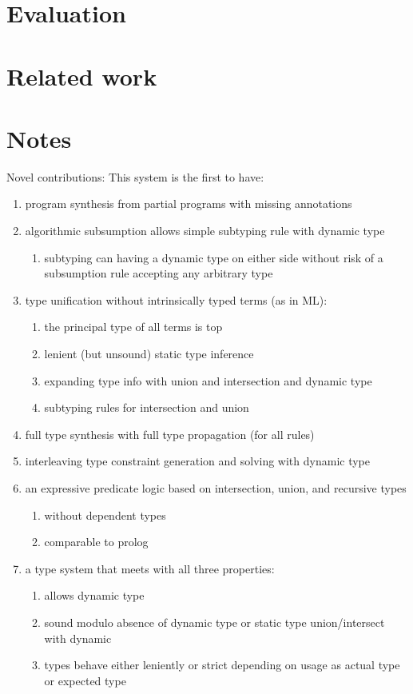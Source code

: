 \documentclass[sigplan,screen]{acmart}
\begin{document}
\section{Evaluation}

\section{Related work}

\section*{Notes}

Novel contributions: This system is the first to have:
\begin{enumerate}
  \item program synthesis from partial programs with missing annotations  
  \item algorithmic subsumption allows simple subtyping rule with dynamic type
    \begin{enumerate}
      \item subtyping can having a dynamic type on either side without risk of   
        a subsumption rule accepting any arbitrary type
    \end{enumerate}
  \item type unification without intrinsically typed terms (as in ML): 
    \begin{enumerate}
      \item the principal type of all terms is top
      \item lenient (but unsound) static type inference
      \item expanding type info with union and intersection and dynamic type
      \item subtyping rules for intersection and union 
    \end{enumerate}
  \item full type synthesis with full type propagation (for all rules)
  \item interleaving type constraint generation and solving with dynamic type 
  \item an expressive predicate logic 
    based on intersection, union, and recursive types
    \begin{enumerate}
      \item without dependent types 
      \item comparable to prolog 
    \end{enumerate}
  \item a type system that meets with all three properties:
    \begin{enumerate}
      \item allows dynamic type 
      \item sound modulo absence of dynamic type 
        or static type union/intersect with dynamic
      \item types behave either leniently or strict depending on usage as actual type or expected type
    \end{enumerate}
\end{enumerate}
\end{document}
